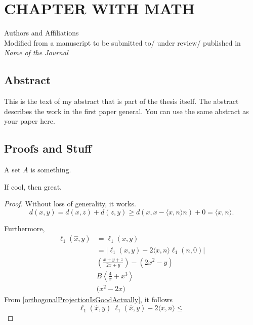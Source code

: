 \newcommand{\RipsD}{\operatorname{Rips}_1}
\newcommand{\Rips}{\operatorname{Rips}}
\newcommand{\ver}{\operatorname{ver}}
\newcommand{\diam}{\operatorname{Diam}}
\newcommand{\midR}{\operatorname{mid}}
\newcommand{\dN}{N_1^*}

\chapter{CHAPTER WITH MATH}
\begin{center}
    Authors and Affiliations \\
    Modified from a manuscript to be submitted to/ under review/ published in \textit{Name of the Journal}
\end{center}

\section{Abstract}
This is the text of my abstract that is part of the thesis itself.
The abstract describes the work in the first paper general. You can use the same abstract as your paper here.
\section{Proofs and Stuff}
\begin{definition}
    A set $A$ is something.
\end{definition}

\begin{lemma}
    If cool, then great.
\end{lemma}
\begin{proof}
    Without loss of generality, it works.
    \begin{equation}
    \label{orthogonalProjectionIsGoodActually}
        d(x,y)= d(x,z)+d(z,y) \geq d(x,x-\langle x,n\rangle n )+0 = \langle x,n\rangle.
    \end{equation}

    Furthermore,
    \begin{align}
        \ell_1(\hat{x},y) & = \ell_1 (x,y)                     \\
                          & =|\ell_1(x,y)-2\langle x,n\rangle \ell_1(n,0)|\\
                          & \left(\frac{x+y+z}{2x+y}\right) - \left(2x^2-y\right)\\ 
                          & B\left\langle \frac{4}{x}+x^3\right\rangle \\ 
                          &\Bigg(x^2-2x\Bigg)
    \end{align}
    From \autoref{orthogonalProjectionIsGoodActually}, it follows \[\ell_1(\hat{x},y)\ \ell_1(\hat{x},y)-2\langle x,n\rangle \leq\] 
\end{proof}


